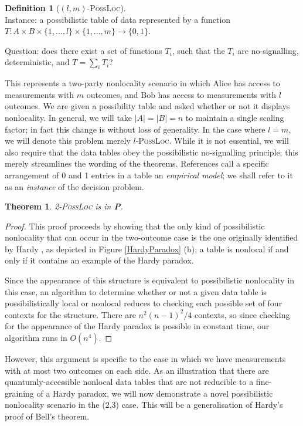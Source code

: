 \documentclass[reprint]{revtex4-1}
\newtheorem{thm}{Theorem}
\theoremstyle{definition}
\newtheorem{defn}{Definition}
\begin{document}
\begin{defn}[$(l,m)$-\textsc{PossLoc}]
\quad\\
Instance: a possibilistic table of data represented by a  function $T:A\times B \times \{1,\dots, l\}\times \{1,\dots, m\}\rightarrow\{0,1\}$.

Question: does there exist a set of functions $T_i$, such that the $T_i$ are no-signalling, deterministic, and $T=\sum_i T_i$?
\end{defn}
This represents a two-party nonlocality scenario in which Alice has access to measurements with $m$ outcomes, and Bob has access to measurements with $l$ outcomes. We are given a possibility table and asked whether or not it displays nonlocality. In general, we will take $|A|=|B|=n$ to maintain a single scaling factor; in fact this change is without loss of generality. In the case where $l=m$, we will denote this problem merely $l$-\textsc{PossLoc}. While it is not essential, we will also require that the data tables obey the possibilistic no-signalling principle; this merely streamlines the wording of the theorems. References \cite{Mans2014, Mans2017} call a specific arrangement of 0 and 1 entries in a table an \emph{empirical model}; we shall refer to it as an \emph{instance} of the decision problem.
\begin{thm} \cite{Mans2017}
2-\textsc{PossLoc} is in \textbf{P}.
\end{thm}
\begin{proof}
This proof proceeds by showing that the only kind of possibilistic nonlocality that can occur in the two-outcome case is the one originally identified by Hardy \cite{Hard1993}, as depicted in Figure \ref{HardyParadox} (b); a table is nonlocal if and only if it contains an example of the Hardy paradox.

Since the appearance of this structure is equivalent to possibilistic nonlocality in this case, an algorithm to determine whether or not a given data table is possibilistically local or nonlocal reduces to checking each possible set of four contexts for the structure. There are $n^2(n-1)^2/4$ contexts, so since checking for the appearance of the Hardy paradox is possible in constant time, our algorithm runs in $O(n^4)$.
\end{proof}
However, this argument is specific to the case in which we have measurements with at most two outcomes on each side. As an illustration that there are quantumly-accessible nonlocal data tables that are not reducible to a fine-graining of a Hardy paradox, we will now demonstrate a novel possibilistic nonlocality scenario in the (2,3) case. This will be a generalisation of Hardy's proof of Bell's theorem.
\end{document}
